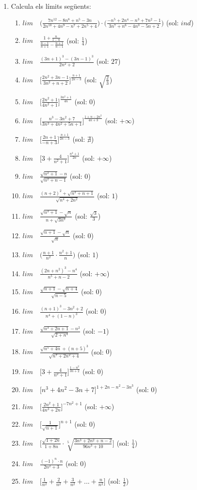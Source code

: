 \documentclass{article}
\begin{document}
\begin{enumerate}
\item Calcula els límits següents:
\begin{enumerate}
	\item $lim \quad \Big(\frac{7n^12-8n^8+n^5-3n}{2n^10+4n^9-n^7+2n^5+4}\Big)\cdot \Big(\frac{-n^5+2n^4-n^3+7n^2-1}{3n^7+n^6-4n^3-5n+2}\Big)$ (sol: $ind$)
	\item $lim \quad \frac{1+\frac{n}{1-n}}{\frac{n-1}{n+1}-\frac{n+1}{n-1}}$ (sol: $\frac{1}{4}$)
	\item $lim \quad \frac{(3n+1)^3-(3n-1)^3}{2n^2+2}$ (sol: $27$)
	\item $lim \quad \Big[\frac{2n^2+3n-1}{3n^2+n+2}\Big]^{\frac{n+1}{2n-3}}$ (sol: $\sqrt{\frac{2}{3}}$)
	\item $lim \quad \Big[\frac{2n^2+1}{4n^2+1}\Big]^{\frac{3n^2+1}{4n}}$ (sol: $0$)
	\item $lim \quad \Big[\frac{n^3-3n^2+7}{3n^3+4n^2+5n+1}\Big]^{\frac{1+n-2n^2}{4n+3}}$ (sol: $+\infty$)
	\item $lim \quad \Big[\frac{2n+1}{-n+3}\Big]^{\frac{n+1}{2n-3}}$ (sol: $\nexists$)
	\item $lim \quad \Big[3+\frac{4}{n^2+1}\Big]^{\frac{n^2+1}{2n}}$ (sol: $+\infty$)
	\item $lim \quad \frac{\sqrt{n^2+1}-n}{\sqrt{n^2+n-1}}$ (sol: $0$)
	\item $lim \quad \frac{(n+2)^2+\sqrt{n^3+n+1}}{\sqrt{n^4+2n^2}}$ (sol: $1$)
	\item $lim \quad \frac{\sqrt{n^3+1}-\sqrt{n}}{n+\sqrt{3n^3}}$ (sol: $\frac{\sqrt{3}}{3}$)
	\item $lim \quad \frac{\sqrt{n+1}-\sqrt{n}}{\sqrt{n}}$ (sol: $0$)
	\item $lim \quad \Big(\frac{n+1}{n^2}\cdot \frac{n^2+1}{n}\Big)$ (sol: $1$)
	\item $lim \quad \frac{(2n+n^2)^3-n^4}{n^5+n-2}$ (sol: $+\infty$)
	\item $lim \quad \frac{\sqrt{n+1}-\sqrt{n+4}}{\sqrt{n-5}}$ (sol: $0$)
	\item $lim \quad \frac{(n+1)^3-3n^2+2}{n^4+(1-n)^3}$ (sol: $0$)
	\item $lim \quad \frac{\sqrt{n^3+2n+1}-n^2}{\sqrt{2+n^4}}$ (sol: $-1$)
	\item $lim \quad \frac{\sqrt{n^5+4n}+(n+5)^3}{\sqrt{n^7+2n^2+4}}$ (sol: $0$)
	\item $lim \quad \Big[3+\frac{4}{n^2+1}\Big]^{\frac{1-n^2}{3n+2}}$ (sol: $0$)
	\item $lim \quad \Big[n^3+4n^2-3n+7]^{1+2n-n^2-3n^3}$ (sol: $0$)
	\item $lim \quad \Big[\frac{2n^2+1}{4n^3+2n}\Big]^{-7n^2+1}$ (sol: $+\infty$)
	\item $lim \quad \Big[\frac{1}{\sqrt{n+1}}\Big]^{n+1}$ (sol: $0$)
	\item $lim \quad \Big[\frac{\sqrt{1+2n}}{1+8n}\cdot \sqrt[5]{\frac{3n^3+2n^2+n-2}{96n^3+10}}\Big]$ (sol: $\frac{1}{4}$)
	\item $lim \quad \frac{(-1)^n\cdot n}{2n^2+3}$ (sol: $0$)
	\item $lim \quad \Big[\frac{1}{n^2}+\frac{2}{n^2}+\frac{3}{n^2}+...+\frac{n}{n^2}\Big]$ (sol: $\frac{1}{2}$)


\end{enumerate}
\end{enumerate}
\end{document}
